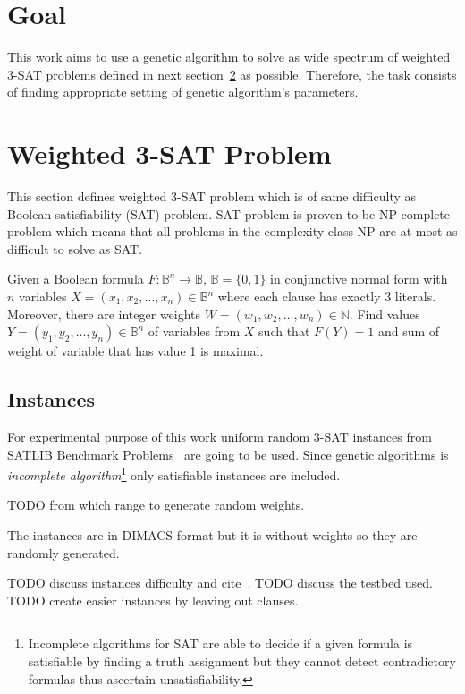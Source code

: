 \documentclass{article}
\begin{document}
\section{Goal}

This work aims to use a genetic algorithm to solve as wide spectrum of
weighted 3-SAT problems defined in next section~\ref{problem} as possible.
Therefore, the task consists of finding appropriate setting of genetic
algorithm's parameters.

\section{Weighted 3-SAT Problem}
\label{problem}

This section defines weighted 3-SAT problem which is of same difficulty
as Boolean satisfiability (SAT) problem.
SAT problem is proven to be NP-complete problem
which means that all problems in the complexity class NP are at most
as difficult to solve as SAT.~\cite{cook1971}

Given a Boolean formula $F: \mathbb{B}^n \to \mathbb{B}$,
$\mathbb{B} = \{0, 1\}$ in conjunctive normal form with $n$ variables
$X = (x_1, x_2, \dots, x_n) \in \mathbb{B}^n$
where each clause has exactly 3 literals.
Moreover, there are integer weights
$W = (w_1, w_2, \dots, w_n) \in \mathbb{N}$.
Find values $Y = (y_1, y_2, \dots, y_n) \in \mathbb{B}^n$ of variables from $X$
such that $F(Y) = 1$
and sum of weight of variable that has value 1 is maximal.

\subsection{Instances}

For experimental purpose of this work uniform random 3-SAT instances
from SATLIB Benchmark Problems~\cite{hoos2000} are going to be used.
Since genetic algorithms is \textit{incomplete algorithm}\footnote{Incomplete
algorithms for SAT are able to decide if a given formula is satisfiable by
finding a truth assignment
but they cannot detect contradictory formulas thus ascertain unsatisfiability.}
only satisfiable instances are included.

TODO from which range to generate random weights.

The instances are in DIMACS format but it is without weights
so they are randomly generated.

TODO discuss instances difficulty and cite~\cite{selman1996}.
TODO discuss the testbed used.
TODO create easier instances by leaving out clauses.
\end{document}
